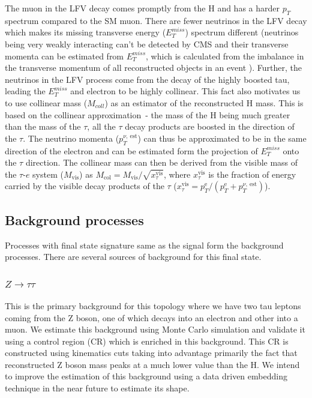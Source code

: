 \documentclass[a4paper,11pt]{article}
\begin{document}
The muon in the LFV decay comes promptly from the H and has a harder $p_{T}$ spectrum compared to the SM muon. There are fewer neutrinos in the LFV decay which makes its missing transverse energy ($E_{T}^{miss}$) spectrum  different (neutrinos being very weakly interacting can't be detected by CMS and their transverse momenta can be estimated from $E_{T}^{miss}$, which is calculated from the imbalance in the transverse momentum of all reconstructed objects in an event ). Further, the neutrinos in the LFV process come from the decay of the highly boosted tau, leading the $E_{T}^{miss}$ and electron to be highly collinear. This fact also motivates us to use collinear mass ($M_{coll}$) as an estimator of the reconstructed H mass. This is based on the collinear approximation~\cite{h}- the mass of the H being much greater than the mass of the $\tau$, all the $\tau$ decay products are boosted in the direction of the $\tau$. The neutrino momenta ($p_{T}^{\nu,~\text{est}}$) can thus be approximated to be in the same direction of the electron and can be estimated form the projection of $E_{T}^{miss}$ onto the $\tau$ direction. The collinear mass can then be derived from the visible mass of the $\tau$-$e$ system ($M_{\text{vis}}$) as $M_{\text{col}}= M_{\text{vis}} / \sqrt{x_{\tau}^\text{vis}}$, where $x_{\tau}^\text{vis}$ is the fraction of energy carried by the visible decay products of the $\tau$ ($x_{\tau}^\text{vis}={p_{T}^{{\text{e}}}}/{(p_{T}^{\text{e}}+p_{T}^{\nu,~\text{est}})}$).

\subsection{Background processes}
Processes with final state signature same as the signal form the background processes. There are several sources of  background for this final state.
\subsubsection{$Z\rightarrow \tau \tau$}
This is the primary background for this topology where we have two tau leptons coming from the Z boson, one of which decays into an electron and other into a muon. We estimate this background using Monte Carlo simulation and validate it using a control region (CR) which is enriched in this background. This CR is constructed using kinematics cuts taking into advantage primarily the fact that reconstructed Z boson mass peaks at a much lower value than the H. We intend to improve the estimation of this background using a data driven embedding technique in the near future to estimate its shape.
\end{document}
